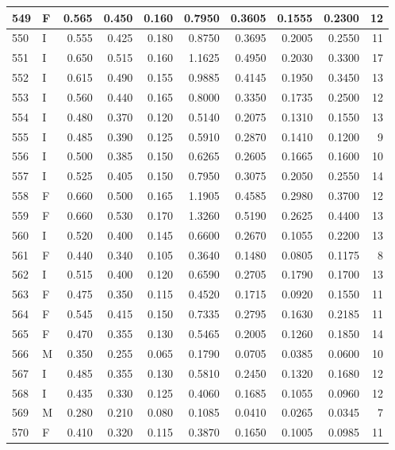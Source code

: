 \documentclass[9pt,twocolumn,twoside,]{pnas-new}
\begin{document}
\begin{tabular}{l|l|r|r|r|r|r|r|r|r}
\hline
549 & F & 0.565 & 0.450 & 0.160 & 0.7950 & 0.3605 & 0.1555 & 0.2300 & 12\\
\hline
550 & I & 0.555 & 0.425 & 0.180 & 0.8750 & 0.3695 & 0.2005 & 0.2550 & 11\\
\hline
551 & I & 0.650 & 0.515 & 0.160 & 1.1625 & 0.4950 & 0.2030 & 0.3300 & 17\\
\hline
552 & I & 0.615 & 0.490 & 0.155 & 0.9885 & 0.4145 & 0.1950 & 0.3450 & 13\\
\hline
553 & I & 0.560 & 0.440 & 0.165 & 0.8000 & 0.3350 & 0.1735 & 0.2500 & 12\\
\hline
554 & I & 0.480 & 0.370 & 0.120 & 0.5140 & 0.2075 & 0.1310 & 0.1550 & 13\\
\hline
555 & I & 0.485 & 0.390 & 0.125 & 0.5910 & 0.2870 & 0.1410 & 0.1200 & 9\\
\hline
556 & I & 0.500 & 0.385 & 0.150 & 0.6265 & 0.2605 & 0.1665 & 0.1600 & 10\\
\hline
557 & I & 0.525 & 0.405 & 0.150 & 0.7950 & 0.3075 & 0.2050 & 0.2550 & 14\\
\hline
558 & F & 0.660 & 0.500 & 0.165 & 1.1905 & 0.4585 & 0.2980 & 0.3700 & 12\\
\hline
559 & F & 0.660 & 0.530 & 0.170 & 1.3260 & 0.5190 & 0.2625 & 0.4400 & 13\\
\hline
560 & I & 0.520 & 0.400 & 0.145 & 0.6600 & 0.2670 & 0.1055 & 0.2200 & 13\\
\hline
561 & F & 0.440 & 0.340 & 0.105 & 0.3640 & 0.1480 & 0.0805 & 0.1175 & 8\\
\hline
562 & I & 0.515 & 0.400 & 0.120 & 0.6590 & 0.2705 & 0.1790 & 0.1700 & 13\\
\hline
563 & F & 0.475 & 0.350 & 0.115 & 0.4520 & 0.1715 & 0.0920 & 0.1550 & 11\\
\hline
564 & F & 0.545 & 0.415 & 0.150 & 0.7335 & 0.2795 & 0.1630 & 0.2185 & 11\\
\hline
565 & F & 0.470 & 0.355 & 0.130 & 0.5465 & 0.2005 & 0.1260 & 0.1850 & 14\\
\hline
566 & M & 0.350 & 0.255 & 0.065 & 0.1790 & 0.0705 & 0.0385 & 0.0600 & 10\\
\hline
567 & I & 0.485 & 0.355 & 0.130 & 0.5810 & 0.2450 & 0.1320 & 0.1680 & 12\\
\hline
568 & I & 0.435 & 0.330 & 0.125 & 0.4060 & 0.1685 & 0.1055 & 0.0960 & 12\\
\hline
569 & M & 0.280 & 0.210 & 0.080 & 0.1085 & 0.0410 & 0.0265 & 0.0345 & 7\\
\hline
570 & F & 0.410 & 0.320 & 0.115 & 0.3870 & 0.1650 & 0.1005 & 0.0985 & 11\\

\end{tabular}
\end{document}

